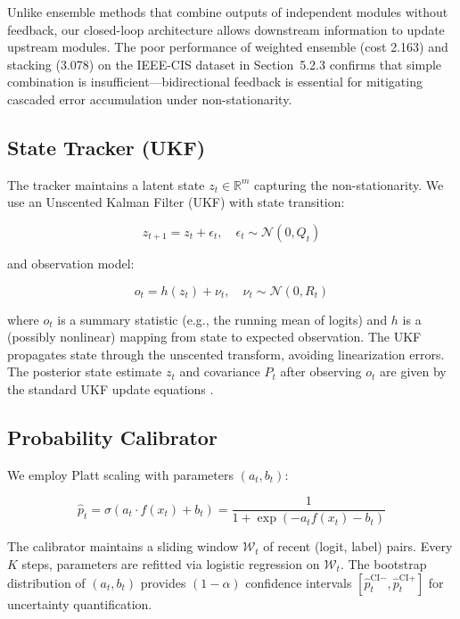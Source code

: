 \documentclass[12pt,a4paper]{article}
\newcommand{\R}{\mathbb{R}}
\begin{document}
Unlike ensemble methods that combine outputs of independent modules without feedback, our closed-loop architecture allows downstream information to update upstream modules. The poor performance of weighted ensemble (cost 2.163) and stacking (3.078) on the IEEE-CIS dataset in Section~5.2.3 confirms that simple combination is insufficient---bidirectional feedback is essential for mitigating cascaded error accumulation under non-stationarity.

\subsection{State Tracker (UKF)}

The tracker maintains a latent state $z_t \in \R^m$ capturing the non-stationarity. We use an Unscented Kalman Filter (UKF) with state transition:

\begin{equation}
    z_{t+1} = z_t + \epsilon_t, \quad \epsilon_t \sim \mathcal{N}(0, Q_t) \label{eq:state_transition}
\end{equation}

and observation model:

\begin{equation}
    o_t = h(z_t) + \nu_t, \quad \nu_t \sim \mathcal{N}(0, R_t) \label{eq:observation}
\end{equation}

where $o_t$ is a summary statistic (e.g., the running mean of logits) and $h$ is a (possibly nonlinear) mapping from state to expected observation. The UKF propagates state through the unscented transform, avoiding linearization errors. The posterior state estimate $z_t$ and covariance $P_t$ after observing $o_t$ are given by the standard UKF update equations \citep{Julier1997,Green1995}.

\subsection{Probability Calibrator}

We employ Platt scaling \citep{Platt1999} with parameters $(a_t, b_t)$:

\begin{equation}
    \hat{p}_t = \sigma(a_t \cdot f(x_t) + b_t) = \frac{1}{1 + \exp(-a_t f(x_t) - b_t)} \label{eq:platt}
\end{equation}

The calibrator maintains a sliding window $\mathcal{W}_t$ of recent (logit, label) pairs. Every $K$ steps, parameters are refitted via logistic regression on $\mathcal{W}_t$. The bootstrap distribution of $(a_t, b_t)$ provides $(1-\alpha)$ confidence intervals $[\hat{p}^{\text{CI}-}_t, \hat{p}^{\text{CI}+}_t]$ for uncertainty quantification.
\end{document}
